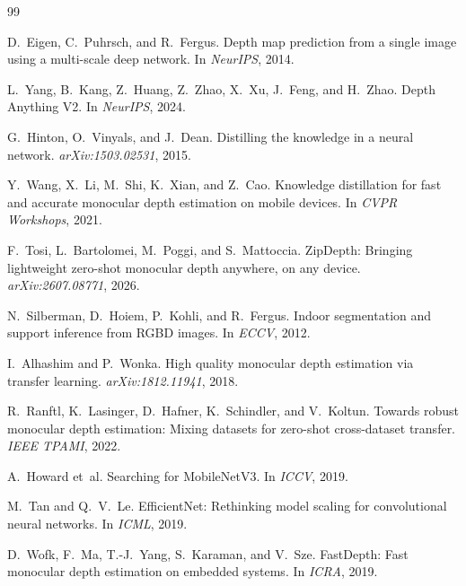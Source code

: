 \documentclass[11pt]{article}
\begin{document}
\begin{thebibliography}{99}
\footnotesize
\setlength{\itemsep}{0pt}

D.~Eigen, C.~Puhrsch, and R.~Fergus.
Depth map prediction from a single image using a multi-scale deep network.
In \emph{NeurIPS}, 2014.

L.~Yang, B.~Kang, Z.~Huang, Z.~Zhao, X.~Xu, J.~Feng, and H.~Zhao.
Depth Anything V2.
In \emph{NeurIPS}, 2024.

G.~Hinton, O.~Vinyals, and J.~Dean.
Distilling the knowledge in a neural network.
\emph{arXiv:1503.02531}, 2015.

Y.~Wang, X.~Li, M.~Shi, K.~Xian, and Z.~Cao.
Knowledge distillation for fast and accurate monocular depth estimation on
mobile devices.
In \emph{CVPR Workshops}, 2021.

F.~Tosi, L.~Bartolomei, M.~Poggi, and S.~Mattoccia.
ZipDepth: Bringing lightweight zero-shot monocular depth anywhere, on any
device.
\emph{arXiv:2607.08771}, 2026.

N.~Silberman, D.~Hoiem, P.~Kohli, and R.~Fergus.
Indoor segmentation and support inference from RGBD images.
In \emph{ECCV}, 2012.

I.~Alhashim and P.~Wonka.
High quality monocular depth estimation via transfer learning.
\emph{arXiv:1812.11941}, 2018.

R.~Ranftl, K.~Lasinger, D.~Hafner, K.~Schindler, and V.~Koltun.
Towards robust monocular depth estimation: Mixing datasets for zero-shot
cross-dataset transfer.
\emph{IEEE TPAMI}, 2022.

A.~Howard et~al.
Searching for MobileNetV3.
In \emph{ICCV}, 2019.

M.~Tan and Q.~V.~Le.
EfficientNet: Rethinking model scaling for convolutional neural networks.
In \emph{ICML}, 2019.

D.~Wofk, F.~Ma, T.-J.~Yang, S.~Karaman, and V.~Sze.
FastDepth: Fast monocular depth estimation on embedded systems.
In \emph{ICRA}, 2019.

\end{thebibliography}
\end{document}
